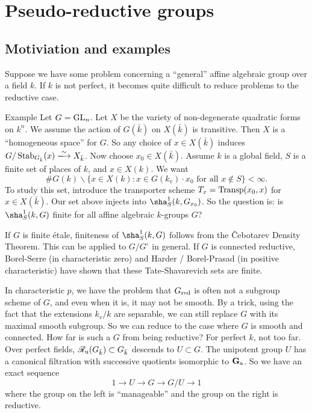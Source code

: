

\section{Pseudo-reductive groups}





\subsection{Motiviation and examples}

Suppose we have some problem concerning a ``general'' affine algebraic group over 
a field $k$. If $k$ is not perfect, it becomes quite difficult to reduce problems 
to the reductive case. 

\begin{enonce}[remark]{Example}
Let $G=\operatorname{GL}_n$. Let $X$ be the variety of non-degenerate quadratic forms 
on $k^n$. We assume the action of $G(\bar k)$ on $X(\bar k)$ is transitive. Then 
$X$ is a ``homogeneous space'' for $G$. So any choice of $x\in X(\bar k)$ induces 
$G/\stabilizer_{G_{\bar k}}(x) \isomorphism X_{\bar k}$. Now choose 
$x_0\in X(\bar k)$. Assume $k$ is a global field, $S$ is a finite set of places of 
$k$, and $x\in X(k)$. We want 
\[
  \# G(k)\backslash \{x\in X(k):x\in G(k_v)\cdot x_0\text{ for all }x\notin S\} < \infty .
\]
To study this set, introduce the transporter scheme $T_x=\operatorname{Transp}(x_0,x)$ for 
$x\in X(\bar k)$. Our set above injects into 
$\sha_S^1(k, G_{x_0})$. So the question is: is $\sha_S^1(k,G)$ finite for all affine 
algebraic $k$-groups $G$?
\end{enonce}

If $G$ is finite \'etale, finiteness of $\sha_S^1(k,G)$ follows from the 
\v Cebotarev Density Theorem. This can be applied to $G/G^\circ$ in general. 
If $G$ is connected reductive, Borel-Serre (in characteristic zero) and 
Harder / Borel-Prasad (in positive characteristic) have shown that these 
Tate-Shavarevich sets are finite. 

In characteristic $p$, we have the problem that $G_{\mathrm{red}}$ is often not a 
subgroup scheme of $G$, and even when it is, it may not be smooth. By a trick, 
using the fact that the extensions $k_v/k$ are separable, we can still replace 
$G$ with its maximal smooth subgroup. So we can reduce to the case where $G$ is 
smooth and connected. How far is such a $G$ from being reductive? For perfect 
$k$, not too far. Over perfect fields, $\mathscr{R}_{\mathrm{u}}(G_{\bar k})\subset G_{\bar k}$ 
descends to $U\subset G$. The unipotent group $U$ has a canonical filtration 
with successive quotients isomorphic to $\mathbf{G}_{\mathrm{a}}$. So we have an 
exact sequence 
\[
  1 \to U \to G \to G/U \to 1
\]
where the group on the left is ``manageable'' and the group on the right is 
reductive. 

